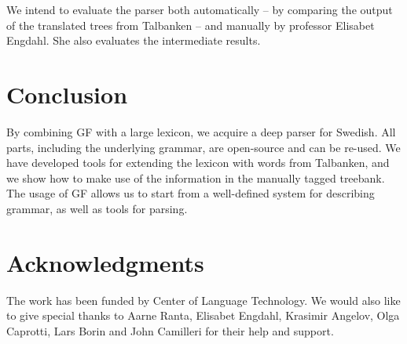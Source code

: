 \documentclass[submission]{eptcs} %
\begin{document}
We intend to evaluate the parser both automatically -- by comparing the output of
the translated trees from Talbanken -- and manually by professor Elisabet Engdahl.
She also evaluates the intermediate results.


\section{Conclusion}
By combining GF with a large lexicon, we acquire a deep parser for 
Swedish. All parts, including the underlying grammar, are open-source and can be re-used.
We have developed tools for extending the lexicon with words from Talbanken,
and we show how to make use of the information in the manually tagged
treebank.
The usage of GF allows us to start from a well-defined system for describing
grammar, as well as tools for parsing.

\section{Acknowledgments}
The work has been funded by Center of Language Technology.
We would also like to give special thanks to Aarne Ranta,
Elisabet Engdahl, Krasimir Angelov, Olga Caprotti, Lars Borin and John Camilleri for their help
and support.



\nocite{*}


\end{document}
